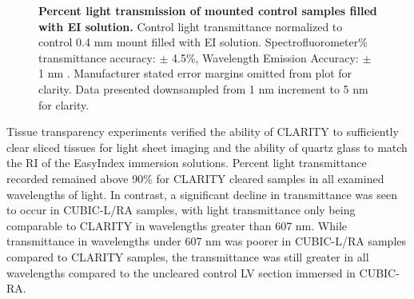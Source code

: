 \begin{figure}[H]
    \centering
    \caption{\textbf{Percent light transmission of mounted control samples filled with EI solution.} Control light transmittance normalized to control 0.4 mm mount filled with EI solution. Spectrofluorometer\% transmittance accuracy: $\pm$ 4.5\%, Wavelength Emission Accuracy: $\pm$ 1 nm \cite{noauthor_duetta_nodate}. Manufacturer stated error margins omitted from plot for clarity. Data presented downsampled from 1 nm increment to 5 nm for clarity.}
    \label{fig:enter-label}
\end{figure}

Tissue transparency experiments verified the ability of CLARITY  to sufficiently clear sliced tissues for light sheet imaging and the ability of quartz glass to match the RI of the EasyIndex immersion solutions. Percent light transmittance recorded remained above 90\% for CLARITY cleared samples in all examined wavelengths of light. In contrast, a significant decline in transmittance was seen to occur in CUBIC-L/RA samples, with light transmittance only being comparable to CLARITY in wavelengths greater than 607 nm. While transmittance in wavelengths under 607 nm was poorer in CUBIC-L/RA samples compared to CLARITY samples, the transmittance was still greater in all wavelengths compared to the uncleared control LV section immersed in CUBIC-RA. 

